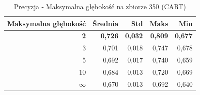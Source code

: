 \begin{table}[htbp]
\centering
\small
\setlength{\tabcolsep}{6pt}
\renewcommand{\arraystretch}{1.2}
\caption{Precyzja - Maksymalna głębokość na zbiorze 350 (CART)}
\label{tab:CART_max_depth_350_precision}
\begin{tabular}{r|r|r|r|r}
\toprule
Maksymalna głębokość & Średnia & Std & Maks & Min \\
\hline
\textbf{2} & \textbf{0,726} & \textbf{0,032} & \textbf{0,809} & \textbf{0,677} \\
3 & 0,701 & 0,018 & 0,747 & 0,678 \\
5 & 0,692 & 0,017 & 0,740 & 0,659 \\
10 & 0,684 & 0,013 & 0,720 & 0,669 \\
$\infty$ & 0,670 & 0,013 & 0,692 & 0,640 \\
\bottomrule
\end{tabular}
\end{table}